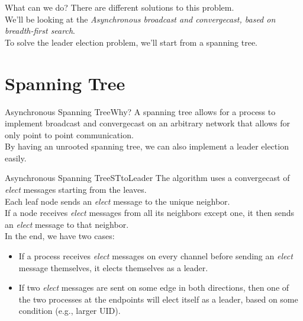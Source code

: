 \documentclass[pdf]{beamer}
\begin{document}
\begin{frame}{What can we do?}
    There are different solutions to this problem.\\
    \vspace{12pt}
    We'll be looking at the \emph{Asynchronous broadcast and convergecast, based on breadth-first search}.\\
    \vspace{12pt}
    To solve the leader election problem, we'll start from a spanning tree.
\end{frame}

\section{Spanning Tree}
\begin{frame}{Asynchronous Spanning Tree}{Why?}
    A spanning tree allows for a process to implement broadcast and convergecast on
    an arbitrary network that allows for only point to point communication.\\
    \vspace{12pt}
    By having an unrooted spanning tree, we can also implement a leader election 
    easily.
\end{frame}

\begin{frame}{Asynchronous Spanning Tree}{STtoLeader}
    The algorithm uses a convergecast of \emph{elect} messages starting from the leaves.\\
    Each leaf node sends an \emph{elect} message to the unique neighbor.\\
    If a node receives \emph{elect} messages from all its neighbors except one, it 
    then sends an \emph{elect} message to that neighbor.\\
    \vspace{12pt}
    In the end, we have two cases:
    \begin{itemize}
        \item{If a process receives \emph{elect} messages on every channel before
              sending an \emph{elect} message themselves, it elects themselves as a leader.}
        \item{If two \emph{elect} messages are sent on some edge in both directions, then
          one of the two processes at the endpoints will elect itself as a leader, based 
          on some condition (e.g., larger UID).}
    \end{itemize}
\end{frame}
\end{document}

